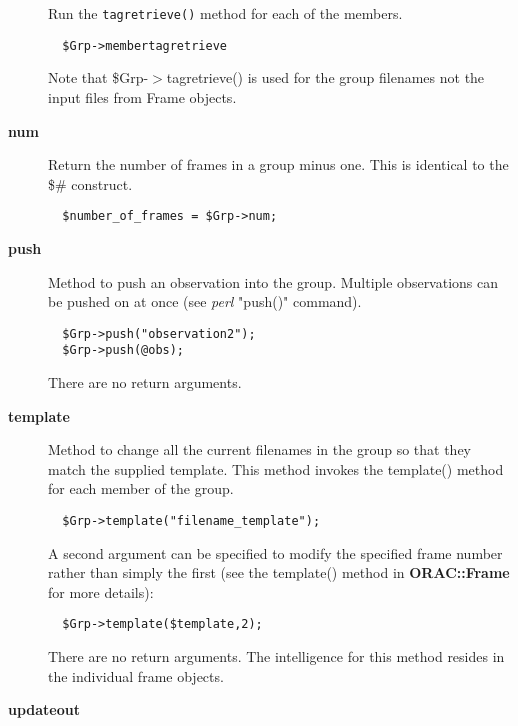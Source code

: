 \begin{description}
Run the \texttt{tagretrieve()} method for each of the members.

\begin{verbatim}
  $Grp->membertagretrieve
\end{verbatim}


Note that \$Grp-$>$tagretrieve() is used for the group filenames
not the input files from Frame objects.


\item[{\textbf{num}}] \mbox{}

Return the number of frames in a group minus one.
This is identical to the \$\# construct.

\begin{verbatim}
  $number_of_frames = $Grp->num;
\end{verbatim}

\item[{\textbf{push}}] \mbox{}

Method to push an observation into the group. Multiple observations
can be pushed on at once (see \emph{perl} "push()" command).

\begin{verbatim}
  $Grp->push("observation2");
  $Grp->push(@obs);
\end{verbatim}


There are no return arguments.


\item[{\textbf{template}}] \mbox{}

Method to change all the current filenames in the group so that they
match the supplied template. This method invokes the template()
method for each member of the group.

\begin{verbatim}
  $Grp->template("filename_template");
\end{verbatim}


A second argument can be specified to modify the specified frame
number rather than simply the first (see the template() method
in \textbf{ORAC::Frame} for more details):

\begin{verbatim}
  $Grp->template($template,2);
\end{verbatim}


There are no return arguments. The intelligence for this method resides
in the individual frame objects.


\item[{\textbf{updateout}}] \mbox{}


\end{description}
